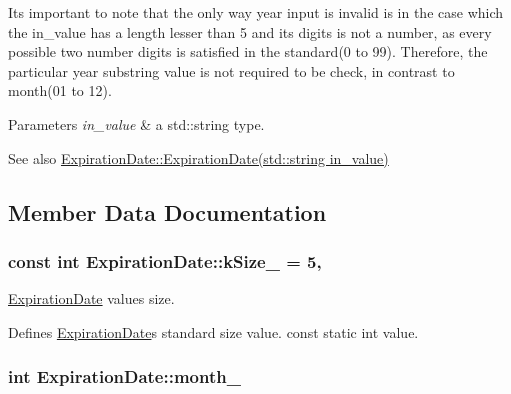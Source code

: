 It\textquotesingle{}s important to note that the only way year input is invalid is in the case which the in\+\_\+value has a length lesser than 5 and its digits is not a number, as every possible two number digits is satisfied in the standard(0 to 99). Therefore, the particular year substring value is not required to be check, in contrast to month(01 to 12).


\begin{DoxyParams}{Parameters}
{\em in\+\_\+value} & a std\+::string type.\\
\hline
\end{DoxyParams}
\begin{DoxySeeAlso}{See also}
\hyperlink{classExpirationDate_ada7d6416fcc75c1faafd578ae56c1ed7}{Expiration\+Date\+::\+Expiration\+Date(std\+::string in\+\_\+value)} 
\end{DoxySeeAlso}


\subsection{Member Data Documentation}
\subsubsection[{\texorpdfstring{k\+Size\+\_\+}{kSize_}}]{\setlength{\rightskip}{0pt plus 5cm}const int Expiration\+Date\+::k\+Size\+\_\+ = 5\hspace{0.3cm}{\ttfamily [static]}, {\ttfamily [private]}}\hypertarget{classExpirationDate_a33ebe65d3c314fc67fd972a0969b6a21}{}\label{classExpirationDate_a33ebe65d3c314fc67fd972a0969b6a21}


\hyperlink{classExpirationDate}{Expiration\+Date} value\textquotesingle{}s size. 

Defines \hyperlink{classExpirationDate}{Expiration\+Date}\textquotesingle{}s standard size value. const static int value. 
\subsubsection[{\texorpdfstring{month\+\_\+}{month_}}]{\setlength{\rightskip}{0pt plus 5cm}int Expiration\+Date\+::month\+\_\+\hspace{0.3cm}{\ttfamily [private]}}\hypertarget{classExpirationDate_ad51648c09ae9ed6dfceb14a00324295a}{}\label{classExpirationDate_ad51648c09ae9ed6dfceb14a00324295a}



